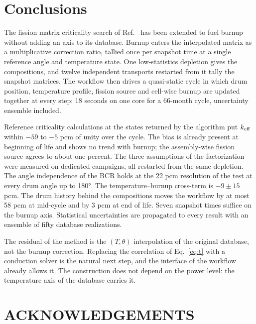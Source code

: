 \documentclass[]{ANStopical}
\begin{document}
\section{Conclusions}\label{sec:concl}

The fission matrix criticality search of Ref.~\cite{vita2026fm} has been extended to fuel burnup without adding an axis to its database. Burnup enters the interpolated matrix as a multiplicative correction ratio, tallied once per snapshot time at a single reference angle and temperature state. One low-statistics depletion gives the compositions, and twelve independent transports restarted from it tally the snapshot matrices. The workflow then drives a quasi-static cycle in which drum position, temperature profile, fission source and cell-wise burnup are updated together at every step: 18 seconds on one core for a 66-month cycle, uncertainty ensemble included.

Reference criticality calculations at the states returned by the algorithm put $k_{\rm eff}$ within $-59$ to $-5$ pcm of unity over the cycle. The bias is already present at beginning of life and shows no trend with burnup; the assembly-wise fission source agrees to about one percent. The three assumptions of the factorization were measured on dedicated campaigns, all restarted from the same depletion. The angle independence of the BCR holds at the 22 pcm resolution of the test at every drum angle up to \ang{180}. The temperature--burnup cross-term is $-9 \pm 15$ pcm. The drum history behind the compositions moves the workflow by at most 58 pcm at mid-cycle and by 3 pcm at end of life. Seven snapshot times suffice on the burnup axis. Statistical uncertainties are propagated to every result with an ensemble of fifty database realizations.

The residual of the method is the $(T,\theta)$ interpolation of the original database, not the burnup correction. Replacing the correlation of Eq.~\eqref{eq:t} with a conduction solver is the natural next step, and the interface of the workflow already allows it. The construction does not depend on the power level: the temperature axis of the database carries it.

\section*{ACKNOWLEDGEMENTS}

\let\oldbibliography\thebibliography
\renewcommand{\thebibliography}[1]{\oldbibliography{#1}%
  \setlength{\itemsep}{1pt}\setlength{\parskip}{0pt}\setlength{\parsep}{0pt}}


\end{document}
